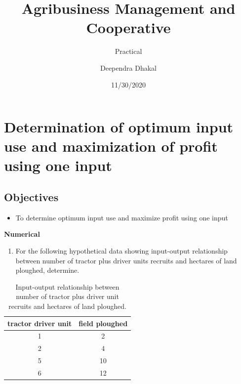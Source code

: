 \documentclass[
]{article}
\title{Agribusiness Management and Cooperative}
\subtitle{Practical}
\author{Deependra Dhakal}
\date{11/30/2020}
\providecommand{\tightlist}{%
  \setlength{\itemsep}{0pt}\setlength{\parskip}{0pt}}
\begin{document}
\maketitle

{
\setcounter{tocdepth}{1}
\tableofcontents
}
\clearpage

\hypertarget{determination-of-optimum-input-use-and-maximization-of-profit-using-one-input}{%
\section{Determination of optimum input use and maximization of profit using one input}\label{determination-of-optimum-input-use-and-maximization-of-profit-using-one-input}}

\hypertarget{objectives}{%
\subsection*{Objectives}\label{objectives}}

\begin{itemize}
\tightlist
\item
  To determine optimum input use and maximize profit using one input
\end{itemize}

\textbf{Numerical}

\begin{enumerate}
\def\labelenumi{\arabic{enumi}.}
\tightlist
\item
  For the following hypothetical data showing input-output relationship between number of tractor plus driver units recruits and hectares of land ploughed, determine.
\end{enumerate}

\begin{table}[H]

\caption{\label{tab:tractor-driver-unit-cmr-tab}Input-output relationship between number of tractor plus driver unit recruits and hectares of land ploughed.}
\centering
\fontsize{8}{10}\selectfont
\begin{tabular}[t]{cc}
\toprule
tractor driver unit & field ploughed\\
\midrule
1 & 2\\
2 & 4\\
5 & 10\\
6 & 12\\
\bottomrule
\end{tabular}
\end{table}
\end{document}

